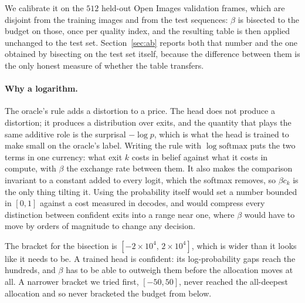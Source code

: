 \documentclass[10pt,twocolumn,letterpaper]{article}
\begin{document}
We calibrate it on the $512$ held-out Open Images validation frames, which are
disjoint from the training images and from the test sequences: $\beta$ is
bisected to the budget on those, once per quality index, and the resulting table
is then applied unchanged to the test set. Section~\ref{sec:ab} reports both
that number and the one obtained by bisecting on the test set itself, because
the difference between them is the only honest measure of whether the table
transfers.

\paragraph{Why a logarithm.} The oracle's rule adds a distortion to a price. The
head does not produce a distortion; it produces a distribution over exits, and
the quantity that plays the same additive role is the surprisal
$-\log p$, which is what the head is trained to make small on the oracle's
label. Writing the rule with $\log\mathrm{softmax}$ puts the two terms in one
currency: what exit $k$ costs in belief against what it costs in compute, with
$\beta$ the exchange rate between them. It also makes the comparison invariant
to a constant added to every logit, which the softmax removes, so $\beta c_k$ is
the only thing tilting it. Using the probability itself would set a number
bounded in $[0,1]$ against a cost measured in decodes, and would compress every
distinction between confident exits into a range near one, where $\beta$ would
have to move by orders of magnitude to change any decision.

The bracket for the bisection is $[-2\!\times\!10^{4},\,2\!\times\!10^{4}]$,
which is wider than it looks like it needs to be. A trained head is confident:
its log-probability gaps reach the hundreds, and $\beta$ has to be able to
outweigh them before the allocation moves at all. A narrower bracket we tried
first, $[-50, 50]$, never reached the all-deepest allocation and so never
bracketed the budget from below.
\end{document}
